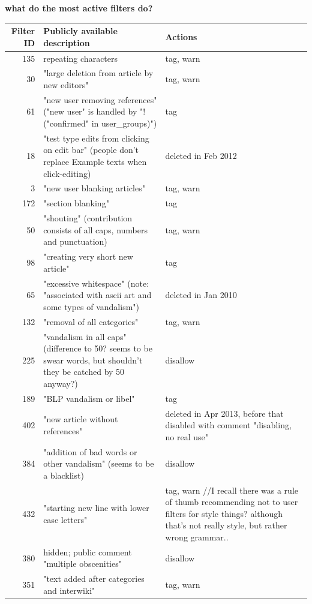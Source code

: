 \documentclass{sigchi}
\begin{document}
\textbf{what do the most active filters do?}

\begin{table}
  \centering
    \begin{tabular}{r p{10cm} p{5cm} }
    Filter ID & Publicly available description & Actions \\
    \hline
      135 & repeating characters & tag, warn \\
      30 & "large deletion from article by new editors" & tag, warn \\
      61 & "new user removing references" ("new user" is handled by "!("confirmed" in user\_groups)") & tag \\
      18 & "test type edits from clicking on edit bar" (people don't replace Example texts when click-editing) & deleted in Feb 2012 \\
      3 & "new user blanking articles" & tag, warn \\
      172 & "section blanking" & tag \\
      50 & "shouting" (contribution consists of all caps, numbers and punctuation) & tag, warn \\
      98 & "creating very short new article" & tag \\
      65 & "excessive whitespace" (note: "associated with ascii art and some types of vandalism") & deleted in Jan 2010 \\
      132 & "removal of all categories" & tag, warn \\
      225 & "vandalism in all caps" (difference to 50? seems to be swear words, but shouldn't they be catched by 50 anyway?) & disallow \\
      189 & "BLP vandalism or libel" & tag \\
      402 & "new article without references" & deleted in Apr 2013, before that disabled with comment "disabling, no real use" \\
      384 & "addition of bad words or other vandalism" (seems to be a blacklist) & disallow \\
      432 & "starting new line with lower case letters" & tag, warn //I recall there was a rule of thumb recommending not to user filters for style things? although that's not really style, but rather wrong grammar.. \\
      380 & hidden; public comment "multiple obscenities" & disallow \\
      351 & "text added after categories and interwiki" & tag, warn \\

\end{tabular}
\end{table}
\end{document}
